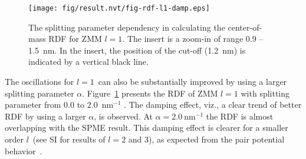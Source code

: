 \documentclass[a4paper,preprint,unsortedaddress,onecolumn,fleqn]{revtex4}
\begin{document}
\begin{figure}[tbp]
\centering
\texttt{[image: fig/result.nvt/fig-rdf-l1-damp.eps]}
\caption{ The splitting parameter dependency in calculating the
center-of-mass RDF for ZMM  $l=1$. The insert is a zoom-in of range 0.9
-- 1.5~nm. In the insert, the position of the cut-off (1.2~nm) is indicated
by a vertical black line. }
\label{fig:rdf-damp}
\end{figure}

The oscillations for $l=1$\ can also be substantially improved by using a
larger splitting parameter $\alpha $. Figure~\ref{fig:rdf-damp} presents the
RDF of ZMM $l=1$ with splitting parameter from $0.0$ to $2.0$~$\text{nm}^{-1}$%
. The damping effect, viz., a clear trend of better RDF by using a larger $%
\alpha $, is observed. At $\alpha =2.0\ \text{nm}^{-1}$ the RDF is almost
overlapping with the SPME result. This damping effect is clearer for a
smaller order $l$\ (see SI for results of {$l=2$ and $3$}), as expected from
the pair potential behavior~\cite{fukuda2014zero}.




\end{document}
